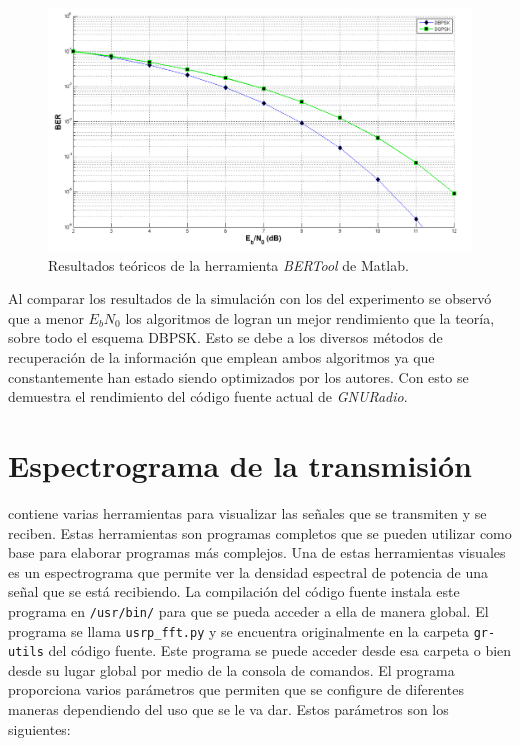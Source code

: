 \begin{figure}[htp]
  \centering
  \includegraphics[scale=0.455]{figs/berteor}
  \caption{Resultados te\'oricos de la herramienta \emph{BERTool} de Matlab.}
  \label{fig:berteor}
\end{figure}

Al comparar los resultados de la simulaci\'on con los del experimento se observ\'o que a menor $E_bN_0$ los algoritmos de
\gnuradio logran un mejor rendimiento que la teor\'ia, sobre todo el esquema DBPSK. Esto se debe a los diversos m\'etodos de
recuperaci\'on de la informaci\'on que emplean ambos algoritmos ya que constantemente han estado siendo optimizados por los
autores. Con esto se demuestra el rendimiento del c\'odigo fuente actual de \emph{GNURadio}.

\section{Espectrograma de la transmisi\'on}

\gnuradio contiene varias herramientas para visualizar las se\~nales que se transmiten y se reciben.
Estas herramientas son programas completos que se pueden utilizar como base para elaborar programas
m\'as complejos. Una de estas herramientas visuales es un espectrograma que permite ver la densidad
espectral de potencia de una se\~nal que se est\'a recibiendo. La compilaci\'on del c\'odigo fuente
instala este programa en \verb|/usr/bin/| para que se pueda acceder a ella de manera global. El
programa se llama \verb|usrp_fft.py| y se encuentra originalmente en la carpeta \verb|gr-utils| del
c\'odigo fuente. Este programa se puede acceder desde esa carpeta o bien desde su lugar global por medio de
la consola de comandos. El programa proporciona varios par\'ametros que permiten que se configure de
diferentes maneras dependiendo del uso que se le va dar. Estos par\'ametros son los siguientes:

